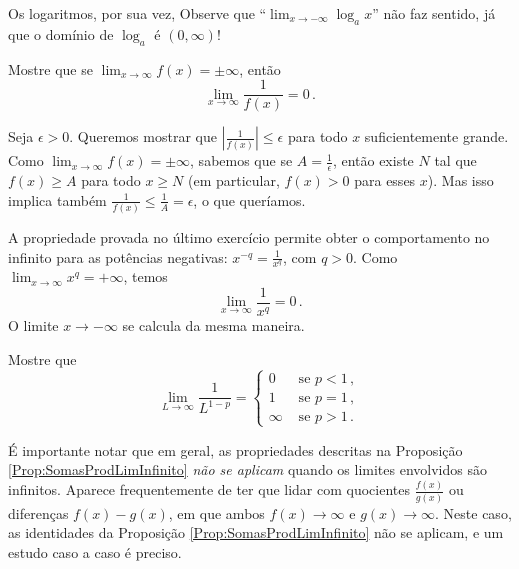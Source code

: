 Os logaritmos, por sua vez,
Observe que ``$\lim_{x\to-\infty}\log_ax$'' não faz sentido, já que
o domínio de $\log_a$ é $(0,\infty)$!

\begin{exo}
Mostre que se $\lim_{x\to\infty}f(x)=\pm\infty$, então
\[ 
\lim_{x\to\infty}\frac{1}{f(x)}=0\,.
\]
\begin{sol}
Seja $\epsilon>0$. Queremos mostrar que $|\frac{1}{f(x)}|\leq \epsilon$ para todo
$x$ suficientemente grande. Como $\lim_{x\to\infty}f(x)=\pm\infty$, sabemos que
se $A=\tfrac1\epsilon$, então existe $N$ tal que $f(x)\geq A$ para todo $x\geq
N$ (em particular, $f(x)>0$ para esses $x$). Mas isso implica também
$\frac{1}{f(x)}\leq \frac{1}{A}=\epsilon$, o que queríamos. 
\end{sol}
\end{exo}

A propriedade provada no último exercício permite obter o
comportamento no infinito para as potências negativas: 
$x^{-q}=\tfrac1{x^q}$, com $q>0$. Como
$\lim_{x\to\infty}x^q=+\infty$, 
temos 
\[ 
\lim_{x\to \infty}\frac{1}{x^q}=0\,.
\]
O limite $x\to -\infty$ se calcula da mesma maneira.

\begin{exo}\label{utilparaimproprias}
Mostre que 
\[
\lim_{L\to\infty}\frac{1}{L^{1-p}}=
\begin{cases}
0&\text{ se }p<1\,,\\
1&\text{ se }p=1\,,\\
\infty&\text{ se }p>1\,.
\end{cases}
\]
\end{exo}

É importante notar que em geral, as propriedades descritas na
Proposição \ref{Prop:SomasProdLimInfinito} 
\emph{não se aplicam} quando os limites envolvidos
são infinitos. 
Aparece frequentemente de ter que lidar com quocientes
$\frac{f(x)}{g(x)}$ ou diferenças $f(x)-g(x)$, em que ambos
$f(x)\to\infty$ e $g(x)\to\infty$. Neste caso, as identidades da
Proposição \ref{Prop:SomasProdLimInfinito} não se aplicam, e um estudo 
caso a caso é preciso.

